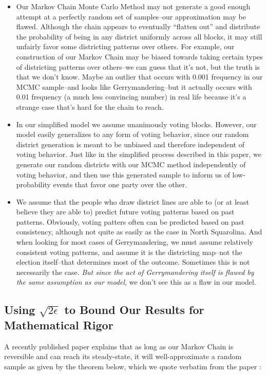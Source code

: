 \documentclass[12pt]{article}
\begin{document}
\begin{itemize}
    \item  Our Markov Chain Monte Carlo Method may not generate a good enough attempt at a perfectly random set of samples--our approximation may be flawed. Although the chain appears to eventually ``flatten out'' and distribute the probability of being in any district uniformly across all blocks, it may still unfairly favor some districting patterns over others. For example, our construction of our Markov Chain may be biased towards taking certain types of districting patterns over others--we can guess that it's not, but the truth is that we don't know. Maybe an outlier that occurs with 0.001 frequency in our MCMC sample--and looks like Gerrymandering--but it actually occurs with 0.01 frequency (a much less convincing number) in real life because it's a strange case that's hard for the chain to reach.
  \item In our simplified model we assume unanimously voting blocks. However, our model easily generalizes to any form of voting behavior, since our random district generation is meant to be unbiased and therefore independent of voting behavior. Just like in the simplified process described in this paper, we generate our random districts with our MCMC method independently of voting behavior, and then use this generated sample to inform us of low-probability events that favor one party over the other.
  \item We assume that the people who draw district lines are able to (or at least believe they are able to) predict future voting patterns based on past patterns. Obviously, voting patters often can be predicted based on past consistency, although not quite as easily as the case in North Squarolina. And when looking for most cases of Gerrymandering, we must assume relatively consistent voting patterns, and assume it is the districting map--not the election itself--that determines most of the outcome. Sometimes this is not necessarily the case. \textit{But since the act of Gerrymandering itself is flawed by the same assumption as our model}, we don't see this as a flaw in our model. 
\end{itemize}
\subsection{Using $\sqrt{2\epsilon}$ to Bound Our Results for Mathematical Rigor}
   A recently published paper explains that as long as our Markov Chain is reversible and can reach its steady-state, it will well-approximate a random sample as given by the theorem below, which we quote verbatim from the paper \cite{CMU}:
\end{document}
